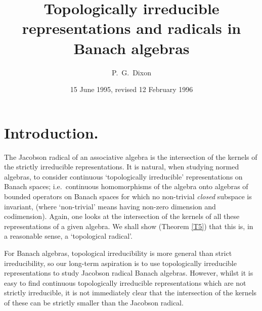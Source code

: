\documentclass[11pt]{article}
\newcommand{\ie}{i.e.\ }
\begin{document}
\title{Topologically irreducible representations and radicals in Banach algebras}
\author{P.~G.~Dixon}
\date{15 June 1995, revised 12 February 1996}
\maketitle
\insert{}
\section{Introduction.}\label{S1}

The Jacobson radical of an associative algebra is the intersection of the
kernels of the strictly irreducible representations.  It is natural, when
studying normed algebras, to consider continuous `topologically irreducible'
representations on Banach spaces; \ie continuous homomorphisms of the algebra
onto algebras of bounded operators on Banach spaces for which no
non-trivial {\em closed} subspace is invariant, (where `non-trivial' means
having non-zero dimension and codimension).  Again, one looks at the
intersection of the kernels of all these representations of a given algebra.  We
shall show (Theorem \ref{T5}) that this is, in a reasonable sense, a
`topological radical'.

For Banach algebras, topological irreducibility is more general than strict
irreducibility, so our long-term aspiration is to use topologically irreducible
representations to study Jacobson radical Banach algebras.   However, whilst it
is easy to find continuous topologically irreducible representations which are
not strictly irreducible, it is not immediately clear that the intersection of
the kernels of these can be strictly smaller than the Jacobson radical.
\end{document}
